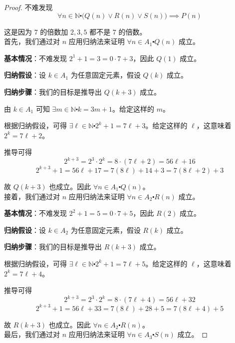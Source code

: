 \begin{example}
\begin{proof}
        不难发现
        \[\forall n \in \mathbb{N} \centerdot \big(Q(n) \lor R(n) \lor S(n)\big) \implies P(n)\]

        这是因为 $7$ 的倍数加 $2, 3, 5$ 都不是 $7$ 的倍数。\\
        
        首先，我们通过对 $n$ 应用归纳法来证明 $\forall n \in A_1 \centerdot Q(n)$ 成立。

        \textbf{基本情况}：不难发现 $2^1+1=3 = 0 \cdot 7 + 3$，因此 $Q(1)$ 成立。

        \textbf{归纳假设}：设 $k \in A_1$ 为任意固定元素，假设 $Q(k)$ 成立。

        \textbf{归纳步骤}：我们的目标是推导出 $Q(k+3)$ 成立。

        由 $k \in A_1$ 可知 $\exists m \in \mathbb{N} \centerdot k = 3m + 1$。给定这样的 $m$。

        根据归纳假设，可得 $\exists \ell \in \mathbb{N} \centerdot 2^k + 1 = 7\ell + 3$。给定这样的 $\ell$，这意味着 $2^k = 7\ell + 2$。

        推导可得
        \[2^{k+3} = 2^3 \cdot 2^k = 8 \cdot (7\ell + 2) = 56\ell + 16\]
        \[2^{k+3} + 1 = 56\ell + 17 = 7(8\ell) + 14 + 3 = 7(8\ell + 2) + 3\]

        故 $Q(k + 3)$ 也成立。因此 $\forall n \in A_1 \centerdot Q(n)$。\\

        接着，我们通过对 $n$ 应用归纳法来证明 $\forall n \in A_2 \centerdot R(n)$ 成立。

        \textbf{基本情况}：不难发现 $2^2+1=5 = 0 \cdot 7 + 5$，因此 $R(2)$ 成立。

        \textbf{归纳假设}：设 $k \in A_2$ 为任意固定元素，假设 $R(k)$ 成立。

        \textbf{归纳步骤}：我们的目标是推导出 $R(k+3)$ 成立。

        根据归纳假设，可得 $\exists \ell \in \mathbb{N} \centerdot 2^k + 1 = 7\ell + 5$。给定这样的 $\ell$，这意味着 $2^k = 7\ell + 4$。

        推导可得
        \[2^{k+3} = 2^3 \cdot 2^k = 8 \cdot (7\ell + 4) = 56\ell + 32\]
        \[2^{k+3} + 1 = 56\ell + 33 = 7(8\ell) + 28 + 5 = 7(8\ell + 4) + 5\]

        故 $R(k + 3)$ 也成立。因此 $\forall n \in A_2 \centerdot R(n)$。\\

        最后，我们通过对 $n$ 应用归纳法来证明 $\forall n \in A_3 \centerdot S(n)$ 成立。


\end{proof}
\end{example}
